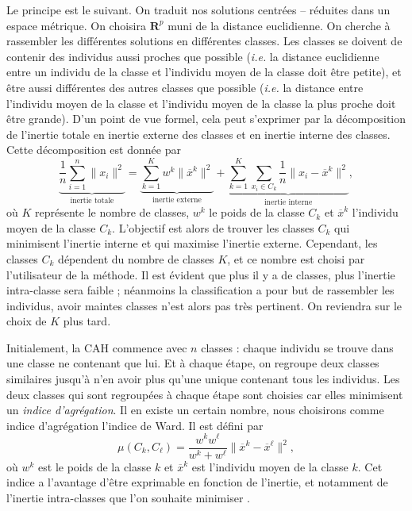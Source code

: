 Le principe est le suivant.
On traduit nos solutions centrées -- réduites dans un espace métrique. On choisira $\mathbf{R}^p$ muni de la distance euclidienne.
On cherche à rassembler les différentes solutions en différentes classes.
Les classes se doivent de contenir des individus aussi proches que possible (\emph{i.e.} la distance euclidienne entre un individu de la classe et l'individu moyen de la classe doit être petite), et être aussi différentes des autres classes que possible (\emph{i.e.} la distance entre l'individu moyen de la classe et l'individu moyen de la classe la plus proche doit être grande).
D'un point de vue formel, cela peut s'exprimer par la décomposition de l'inertie totale en inertie externe des classes et en inertie interne des classes.
Cette décomposition est donnée par
\[
\underbrace{\frac{1}{n}\sum_{i=1}^{n} \lVert x_i \rVert^2}_{\text{inertie totale}} = \underbrace{\sum_{k=1}^{K}w^k\lVert \overline{x}^{k} \rVert^2}_{\text{inertie externe}} +
\underbrace{\sum_{k=1}^{K} \sum_{x_i\in C_k} \frac{1}{n} \lVert x_i - \overline{x}^k \rVert^2}_{\text{inertie interne}},
\]
où $K$ représente le nombre de classes, $w^k$ le poids de la classe $C_k$ et $\overline{x}^{k}$ l'individu moyen de la classe $C_k$.
L'objectif est alors de trouver les classes $C_k$ qui minimisent l'inertie interne et qui maximise l'inertie externe.
Cependant, les classes $C_k$ dépendent du nombre de classes $K$, et ce nombre est choisi par l'utilisateur de la méthode.
Il est évident que plus il y a de classes, plus l'inertie intra-classe sera faible ; néanmoins la classification a pour but de rassembler les individus, avoir maintes classes n'est alors pas très pertinent.
On reviendra sur le choix de $K$ plus tard.

Initialement, la CAH commence avec $n$ classes : chaque individu se trouve dans une classe ne contenant que lui.
Et à chaque étape, on regroupe deux classes similaires jusqu'à n'en avoir plus qu'une unique contenant tous les individus.
Les deux classes qui sont regroupées à chaque étape sont choisies car elles minimisent un \emph{indice d'agrégation}.
Il en existe un certain nombre, nous choisirons comme indice d'agrégation l'indice de Ward.
Il est défini par
\[
\mu\left( C_k, C_{\ell} \right) = \frac{w^kw^{\ell}}{w^k + w^{\ell}}\lVert \overline{x}^k - \overline{x}^{\ell} \rVert^2,
\]
où $w^k$ est le poids de la classe $k$ et $\overline{x}^k$ est l'individu moyen de la classe $k$.
Cet indice a l'avantage d'être exprimable en fonction de l'inertie, et notamment de l'inertie intra-classes que l'on souhaite minimiser \citep{bry}.


